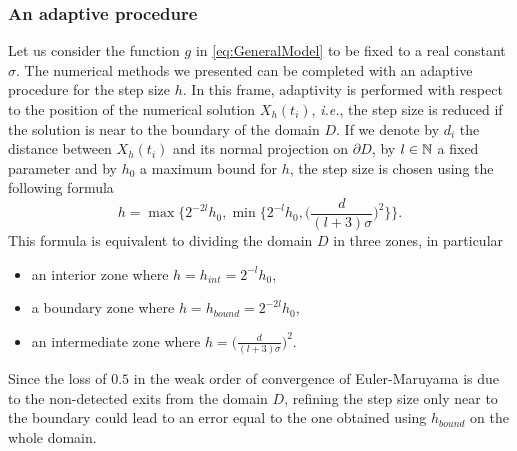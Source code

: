\subsubsection{An adaptive procedure}\label{sec:Adapt}

Let us consider the function $g$ in \eqref{eq:GeneralModel} to be fixed to a real constant $\sigma$. The numerical methods we presented can be completed with an adaptive procedure for the step size $h$. In this frame, adaptivity is performed with respect to the position of the numerical solution $X_h(t_i)$, \textit{i.e.}, the step size is reduced if the solution is near to the boundary of the domain $D$. If we denote by $d_i$ the distance between $X_h(t_i)$ and its normal projection on $\partial D$, by $l \in \mathbb{N}$ a fixed parameter and by $h_0$ a maximum bound for $h$, the step size is chosen using the following formula
\begin{equation}\label{eq:Adaptivity}
	h = \max\Big\{ 2^{-2l}h_0, \min\Big\{ 2^{-l}h_0, \Big(\frac{d}{(l + 3)\sigma}\Big)^2\Big\}\Big\}.
\end{equation}
This formula is equivalent to dividing the domain $D$ in three zones, in particular
\begin{itemize}
	\item an interior zone where $h = h_{int} = 2^{-l}h_0$,
	\item a boundary zone where $h = h_{bound} = 2^{-2l}h_0$,
	\item an intermediate zone where $h = \Big(\frac{d}{(l + 3)\sigma}\Big)^2$.
\end{itemize}
Since the loss of $0.5$ in the weak order of convergence of Euler-Maruyama is due to the non-detected exits from the domain $D$, refining the step size only near to the boundary could lead to an error equal to the one obtained using $h_{bound}$ on the whole domain.
